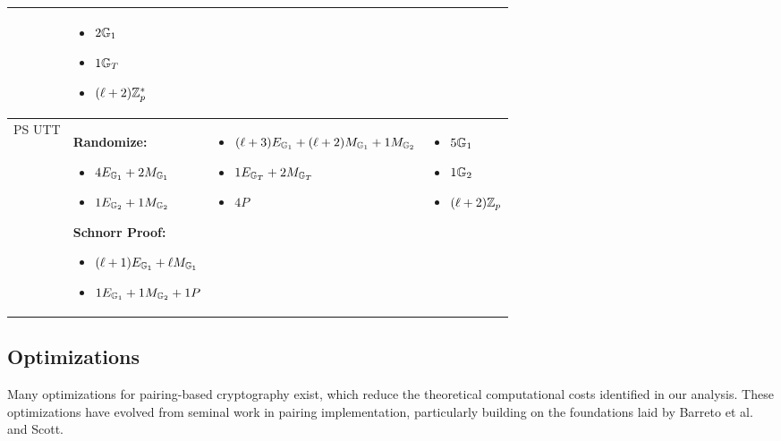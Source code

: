 {\begin{tabular}{|l|p{4.5cm}|p{4.5cm}|p{3.5cm}|}
\begin{itemize}[nosep]
    \end{itemize}
    & 
    \begin{itemize}[nosep]
        \item $2\mathbb{G}_1$
        \item $1\mathbb{G}_T$
        \item $(\ell+2)\mathbb{Z}_p^*$
    \end{itemize}
    \\
    \hline
    PS UTT &
    \textbf{Randomize:}
    \begin{itemize}[nosep]
        \item $4E_{\mathbb{G}_1} + 2M_{\mathbb{G}_1}$ 
        \item $1E_{\mathbb{G}_2} + 1M_{\mathbb{G}_2}$
    \end{itemize}
    \textbf{Schnorr Proof:}
    \begin{itemize}[nosep]
        \item $(\ell+1)E_{\mathbb{G}_1} + \ell M_{\mathbb{G}_1}$ 
        \item $1E_{\mathbb{G}_1} + 1M_{\mathbb{G}_2} + 1P$ 
    \end{itemize}
    &
    \begin{itemize}[nosep]
        \item $(\ell+3)E_{\mathbb{G}_1} + (\ell+2)M_{\mathbb{G}_1} + 1M_{\mathbb{G}_2}$
        \item $1E_{\mathbb{G}_T} + 2M_{\mathbb{G}_T}$
        \item $4P$ 
    \end{itemize}
    &
    \begin{itemize}[nosep]
        \item $5\mathbb{G}_1$
        \item $1\mathbb{G}_2$
        \item $(\ell+2)\mathbb{Z}_p$
    \end{itemize}
    \\
    
     \hline
\end{tabular}






% 
% 


\newpage
\subsection{Optimizations}
Many optimizations for pairing-based cryptography exist, which reduce the theoretical computational costs identified in our analysis. These optimizations have evolved from seminal work in pairing implementation, particularly building on the foundations laid by Barreto et al. and Scott.

}
